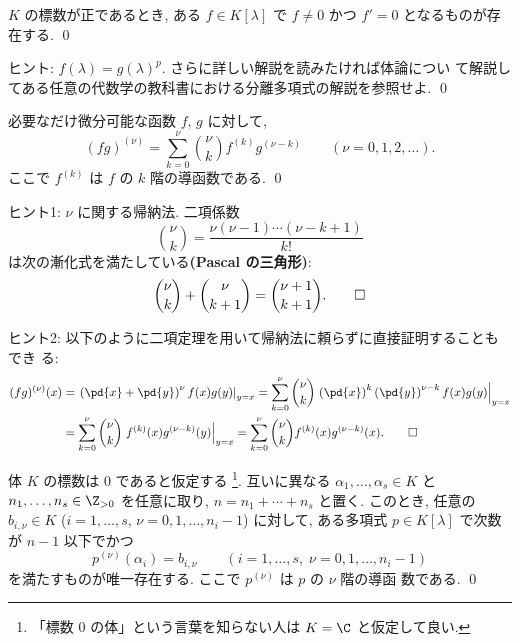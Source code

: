 \documentclass[12pt,twoside]{jarticle}
\begin{document}

\begin{question}
  $K$ の標数が正であるとき, ある $f\in K[\lambda]$ で $f\ne 0$ かつ $f'=0$ 
  となるものが存在する. \qed
\end{question}

\noindent
ヒント: $f(\lambda)=g(\lambda)^p$.  さらに詳しい解説を読みたければ体論につい
て解説してある任意の代数学の教科書における分離多項式の解説を参照せよ.
\qed


\begin{question}
\label{q:Leibnitz-formula}
  必要なだけ微分可能な函数 $f$, $g$ に対して,
  \begin{equation*}
    (fg)^{(\nu)} = \sum_{k=0}^\nu \binom{\nu}{k} f^{(k)}g^{(\nu-k)}
    \qquad (\nu=0,1,2,\ldots).
  \end{equation*}
  ここで $f^{(k)}$ は $f$ の $k$ 階の導函数である. \qed
\end{question}

\noindent
ヒント1: $\nu$ に関する帰納法.  二項係数
\begin{equation*}
  \binom{\nu}{k} = \frac{\nu(\nu-1)\cdots(\nu-k+1)}{k!}
\end{equation*}
は次の漸化式を満たしている{\bf (Pascal の三角形)}:
\begin{equation*}
  \binom{\nu}{k}+\binom{\nu}{k+1} = \binom{\nu+1}{k+1}.
\qed
\end{equation*}

\medskip
\noindent
ヒント2: 以下のように二項定理を用いて帰納法に頼らずに直接証明することもでき
る:
\begin{align*}
  (fg)^{(\nu)}(x) 
  &
  = \left.\left(\pd{x}+\pd{y}\right)^\nu f(x)g(y)\right|_{y=x}
  = \sum_{k=0}^\nu \binom{\nu}{k} 
    \left.\left(\pd{x}\right)^k \left(\pd{y}\right)^{\nu-k}
    f(x)g(y)\right|_{y=x}
  \\ &
  = \sum_{k=0}^\nu \binom{\nu}{k} \left.f^{(k)}(x)g^{(\nu-k)}(y)\right|_{y=x}
  = \sum_{k=0}^\nu \binom{\nu}{k} f^{(k)}(x)g^{(\nu-k)}(x).
\qed
\end{align*}


\begin{question}
\label{q:Lagrange-interpolation-4}
  体 $K$ の標数は $0$ であると仮定する%
  \footnote{「標数 $0$ の体」という言葉を知らない人は $K=\C$ と仮定して良い.}.
  互いに異なる $\alpha_1,\dots,\alpha_s\in K$ 
  と $n_1,\dots,n_s\in\Z_{>0}$ を任意に取り, $n=n_1+\cdots+n_s$ と置く.
  このとき, 任意の  $b_{i,\nu}\in K$  ($i=1,\dots,s$, $\nu=0,1,\dots,n_i-1$) 
  に対して, ある多項式 $p\in K[\lambda]$ で次数が $n-1$ 以下でかつ
  \begin{equation*}
    p^{(\nu)}(\alpha_i) = b_{i,\nu}
    \qquad (i=1,\dots,s,\; \nu=0,1,\dots,n_i-1)
  \end{equation*}
  を満たすものが唯一存在する.   ここで $p^{(\nu)}$ は $p$ の $\nu$ 階の導函
  数である.  \qed
\end{question}
\end{document}

